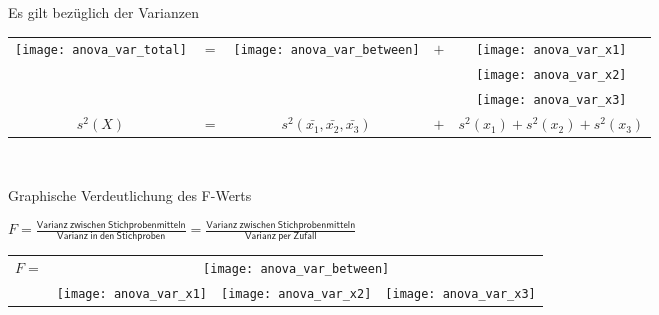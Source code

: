 \begin{frame}
  {Es gilt bezüglich der Varianzen}

  \begin{center}
    \begin{tabular}[h!]{ccccc}
      \multirow{3}{*}{\texttt{[image: anova\_var\_total]}} & \multirow{3}{*}{$=$} & \multirow{3}{*}{\texttt{[image: anova\_var\_between]}} & \multirow{3}{*}{$+$} & \texttt{[image: anova\_var\_x1]} \\
      &&&& \texttt{[image: anova\_var\_x2]} \\
      &&&& \texttt{[image: anova\_var\_x3]} \\
      \hline
      $s^2(X)$ & $=$ & $s^2(\bar{x_1},\bar{x_2},\bar{x_3})$ & $+$ & $s^2(x_1)+s^2(x_2)+s^2(x_3)$ \\
    \end{tabular}\\
    \Zeile
  \end{center}
\end{frame}

\begin{frame}
  {Graphische Verdeutlichung des F-Werts}
  
  \begin{center}
    \alert{$F=\frac{\mathsf{Varianz\ zwischen\ Stichprobenmitteln}}{\mathsf{Varianz\ in\ den\ Stichproben}}=\frac{\mathsf{Varianz\ zwischen\ Stichprobenmitteln}}{\mathsf{Varianz\ per\ Zufall}}$}\\
    \begin{tabular}[h!]{cc}
      \multirow{2}{*}{$F=$} & \texttt{[image: anova\_var\_between]} \\\cline{2-2}
      & \texttt{[image: anova\_var\_x1]}\ \raisebox{1.25cm}{+}\ \texttt{[image: anova\_var\_x2]}\ \raisebox{1.25cm}{+}\ \texttt{[image: anova\_var\_x3]} \\
    \end{tabular}\\
    \Zeile
  \end{center}
\end{frame}

